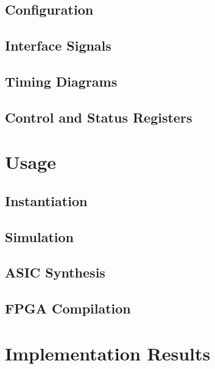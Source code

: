 \documentclass{ug}
\begin{document}
\ifdefined\CONFS
\subsection{Configuration}
\label{sec:ipconfig}

\fi

\subsection{Interface Signals}
\label{sec:ifsig}


\ifdefined\TD
\subsection{Timing Diagrams}
\label{sec:td}

\fi

\ifdefined\CSRS
\subsection{Control and Status Registers}
\label{sec:csrs}

\fi

\ifdefined\SECTIONCLEARPAGE
\clearpage
\fi
\section{Usage}

\subsection{Instantiation}
\label{sec:inst}


\subsection{Simulation}
\label{sec:tbbd}


\ifdefined\ASICSYNTH
\subsection{ASIC Synthesis}
\label{sec:synth}

\fi

\ifdefined\FPGACOMP
\subsection{FPGA Compilation}
\label{sec:fpga}

\fi

\ifdefined\RESULTS
\ifdefined\SECTIONCLEARPAGE
\clearpage
\fi
\section{Implementation Results}
\label{sec:results}

\fi

\ifdefined\CUSTOM

\fi
\end{document}
